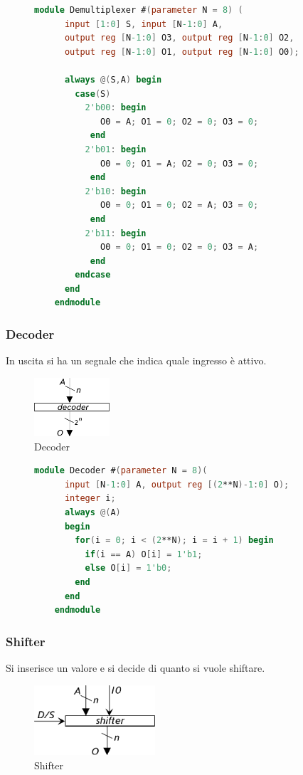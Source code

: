 \documentclass[a4paper]{article}
\theoremstyle{break}
\theoremstyle{break}
\theoremstyle{break}
\theoremstyle{break}
\begin{document}
\begin{figure}[H]
  \begin{lstlisting}[language=Verilog]
    module Demultiplexer #(parameter N = 8) (
      input [1:0] S, input [N-1:0] A,
      output reg [N-1:0] O3, output reg [N-1:0] O2,
      output reg [N-1:0] O1, output reg [N-1:0] O0);
      
      always @(S,A) begin
        case(S)
          2'b00: begin
             O0 = A; O1 = 0; O2 = 0; O3 = 0;
           end
          2'b01: begin
             O0 = 0; O1 = A; O2 = 0; O3 = 0;
           end
          2'b10: begin
             O0 = 0; O1 = 0; O2 = A; O3 = 0;
           end
          2'b11: begin
             O0 = 0; O1 = 0; O2 = 0; O3 = A;
           end
        endcase
      end
    endmodule
  \end{lstlisting}
\end{figure}

\subsubsection{Decoder}
In uscita si ha un segnale che indica quale ingresso è attivo.
\begin{figure}[H]
  \begin{center}
    \includegraphics[width=0.25\textwidth]{figures/decoder}
  \end{center}
  \caption{Decoder}
\end{figure}

\begin{figure}[H]
  \begin{lstlisting}[language=Verilog]
    module Decoder #(parameter N = 8)(
      input [N-1:0] A, output reg [(2**N)-1:0] O);
      integer i;
      always @(A)
      begin
        for(i = 0; i < (2**N); i = i + 1) begin
          if(i == A) O[i] = 1'b1;
          else O[i] = 1'b0;
        end
      end
    endmodule
  \end{lstlisting}
\end{figure}

\subsubsection{Shifter}
Si inserisce un valore e si decide di quanto si vuole shiftare.
\begin{figure}[H]
  \begin{center}
    \includegraphics[width=0.40\textwidth]{figures/shifter}
  \end{center}
  \caption{Shifter}
\end{figure}
\end{document}

